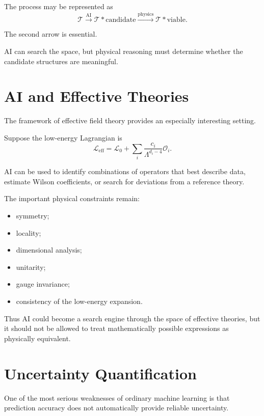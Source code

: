 \documentclass[11pt,a4paper]{article}
\begin{document}
The process may be represented as
\begin{equation}
\mathcal{T}
\overset{\mathrm{AI}}{\longrightarrow}
\mathcal{T}*{\mathrm{candidate}}
\overset{\mathrm{physics}}{\longrightarrow}
\mathcal{T}*{\mathrm{viable}}.
\end{equation}

The second arrow is essential.

AI can search the space, but physical reasoning must determine whether the
candidate structures are meaningful.

\section{AI and Effective Theories}

The framework of effective field theory provides an especially interesting
setting.

Suppose the low-energy Lagrangian is
\begin{equation}
\mathcal{L}_{\mathrm{eff}}=
\mathcal{L}_0
+
\sum_i
\frac{c_i}{\Lambda^{d_i-4}}
\mathcal{O}_i.
\end{equation}

AI can be used to identify combinations of operators that best describe data,
estimate Wilson coefficients, or search for deviations from a reference theory.

The important physical constraints remain:

\begin{itemize}
\item symmetry;
\item locality;
\item dimensional analysis;
\item unitarity;
\item gauge invariance;
\item consistency of the low-energy expansion.
\end{itemize}

Thus AI could become a search engine through the space of effective theories,
but it should not be allowed to treat mathematically possible expressions as
physically equivalent.

\section{Uncertainty Quantification}

One of the most serious weaknesses of ordinary machine learning is that
prediction accuracy does not automatically provide reliable uncertainty.
\end{document}
